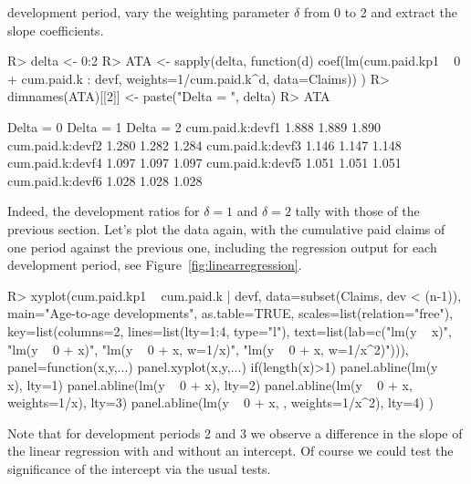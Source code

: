 \documentclass{article}
\begin{document}
development period, vary the weighting parameter $\delta$ from 0 to 2 and 
extract the slope coefficients.
\begin{Schunk}
\begin{Sinput}
R> delta <- 0:2
R> ATA <- sapply(delta, function(d)
     coef(lm(cum.paid.kp1 ~ 0 + cum.paid.k : devf, 
        weights=1/cum.paid.k^d, data=Claims))
   )
R> dimnames(ATA)[[2]] <- paste("Delta = ", delta)
R> ATA
\end{Sinput}
\begin{Soutput}
                 Delta =  0 Delta =  1 Delta =  2
cum.paid.k:devf1      1.888      1.889      1.890
cum.paid.k:devf2      1.280      1.282      1.284
cum.paid.k:devf3      1.146      1.147      1.148
cum.paid.k:devf4      1.097      1.097      1.097
cum.paid.k:devf5      1.051      1.051      1.051
cum.paid.k:devf6      1.028      1.028      1.028
\end{Soutput}
\end{Schunk}
Indeed, the development ratios for $\delta=1$ and $\delta=2$ tally with those 
of the previous section. Let's plot the data again, with the cumulative paid
claims of one period against the previous one, including the regression output
for each development period, see Figure~\ref{fig:linearregression}. 
\begin{Schunk}
\begin{Sinput}
R> xyplot(cum.paid.kp1 ~ cum.paid.k | devf, 
          data=subset(Claims, dev < (n-1)), 
          main="Age-to-age developments", as.table=TRUE, 
          scales=list(relation="free"), 
          key=list(columns=2, lines=list(lty=1:4, type="l"), 
                   text=list(lab=c("lm(y ~ x)",
                                   "lm(y ~ 0 + x)",
                                   "lm(y ~ 0 + x, w=1/x)",
                                   "lm(y ~ 0 + x, w=1/x^2)"))),
          panel=function(x,y,...){
            panel.xyplot(x,y,...)
            if(length(x)>1){
              panel.abline(lm(y ~ x), lty=1)        
              panel.abline(lm(y ~ 0 + x), lty=2)
              panel.abline(lm(y ~ 0 + x, weights=1/x), lty=3)
              panel.abline(lm(y ~ 0 + x, , weights=1/x^2), lty=4)
            }
          }
   )
\end{Sinput}
\end{Schunk}
Note that for development periods 2 and 3 we observe a difference in 
the slope of the linear regression with and without an intercept. Of course we 
could test the significance of the intercept via the usual tests.
\end{document}
